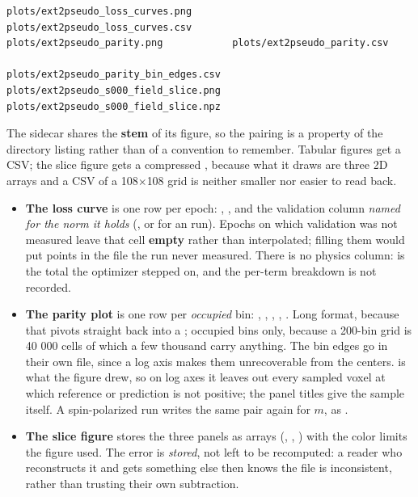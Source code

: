 \begin{lstlisting}
plots/ext2pseudo_loss_curves.png       plots/ext2pseudo_loss_curves.csv
plots/ext2pseudo_parity.png            plots/ext2pseudo_parity.csv
                                    plots/ext2pseudo_parity_bin_edges.csv
plots/ext2pseudo_s000_field_slice.png  plots/ext2pseudo_s000_field_slice.npz
\end{lstlisting}

The sidecar shares the \textbf{stem} of its figure, so the pairing is a property of the directory listing rather than of a convention to remember. Tabular figures get a CSV; the slice figure gets a compressed , because what it draws are three 2D arrays and a CSV of a 108$\times$108 grid is neither smaller nor easier to read back.

\begin{itemize}
  \item \textbf{The loss curve} is one row per epoch: , , and the validation column \emph{named for the norm it holds} (, or  for an  run). Epochs on which validation was not measured leave that cell \textbf{empty} rather than interpolated; filling them would put points in the file the run never measured. There is no physics column:  is the total the optimizer stepped on, and the per-term breakdown is not recorded.
  \item \textbf{The parity plot} is one row per \emph{occupied} bin: , , , , . Long format, because that pivots straight back into a ; occupied bins only, because a 200-bin grid is 40 000 cells of which a few thousand carry anything. The bin edges go in their own file, since a log axis makes them unrecoverable from the centers.  is what the figure drew, so on log axes it leaves out every sampled voxel at which reference or prediction is not positive; the panel titles give the sample itself. A spin-polarized run writes the same pair again for $m$, as .
  \item \textbf{The slice figure} stores the three panels as arrays (, , ) with the color limits the figure used. The error is \emph{stored}, not left to be recomputed: a reader who reconstructs it and gets something else then knows the file is inconsistent, rather than trusting their own subtraction.
\end{itemize}

